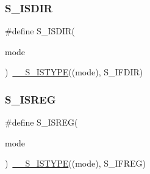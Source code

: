 \mbox{\label{a00116_a3746cdc5aac871e6f6504fbcbd29ef1d}} 
\subsubsection{\texorpdfstring{S\+\_\+\+I\+S\+D\+IR}{S\_ISDIR}}
{\footnotesize\ttfamily \#define S\+\_\+\+I\+S\+D\+IR(\begin{DoxyParamCaption}\item[{}]{mode }\end{DoxyParamCaption})~\hyperlink{a00116_ad6cc2c92a37f1b56b76252e59a354d95}{\+\_\+\+\_\+\+S\+\_\+\+I\+S\+T\+Y\+PE}((mode), S\+\_\+\+I\+F\+D\+IR)}

\mbox{\label{a00116_aad0f32c2c182238f2ff71c83e6ab65a0}} 
\subsubsection{\texorpdfstring{S\+\_\+\+I\+S\+R\+EG}{S\_ISREG}}
{\footnotesize\ttfamily \#define S\+\_\+\+I\+S\+R\+EG(\begin{DoxyParamCaption}\item[{}]{mode }\end{DoxyParamCaption})~\hyperlink{a00116_ad6cc2c92a37f1b56b76252e59a354d95}{\+\_\+\+\_\+\+S\+\_\+\+I\+S\+T\+Y\+PE}((mode), S\+\_\+\+I\+F\+R\+EG)}

